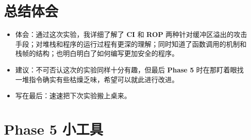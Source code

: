 \section{总结体会}
    \begin{itemize}
        \item 体会：通过这次实验，我详细了解了 \textbf{CI} 和 \textbf{ROP} 两种针对缓冲区溢出的攻击手段；对堆栈和程序的运行过程有更深的理解；同时知道了函数调用的机制和栈帧的结构；也明白明白了如何编写更加安全的程序。
        \item 建议：不可否认这次的实验同样十分有趣，但最后 \textbf{Phase 5} 时在那盯着眼找一堆指令确实有些枯燥乏味，希望可以就此进行改进。
        \item 写在最后：速速把下次实验搬上桌来。
    \end{itemize} 

\section{Phase 5 小工具}
